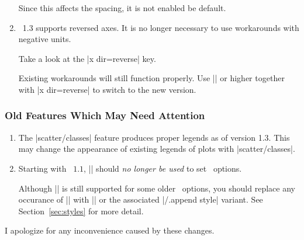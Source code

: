 \begin{enumerate}
	Since this affects the spacing, it is not enabled be default.

	\item \PGFPlots\ 1.3 supports reversed axes. It is no longer necessary to use workarounds with negative units.

	Take a look at the |x dir=reverse| key.

	Existing workarounds will still function properly. Use |\pgfplotsset{compat=1.3}| or higher together with |x dir=reverse| to switch to the new version.
\end{enumerate}

\subsubsection{Old Features Which May Need Attention}
\begin{enumerate}
	\item The |scatter/classes| feature produces proper legends as of version 1.3. This may change the appearance of existing legends of plots with |scatter/classes|.

	\item Starting with \PGFPlots\ $1.1$, |\tikzstyle| should \emph{no longer be used} to set \PGFPlots\ options.
	
	Although |\tikzstyle| is still supported for some older \PGFPlots\ options, you should replace any occurance of |\tikzstyle| with || or the associated |/.append style| variant. See Section~\ref{sec:styles} for more detail.
\end{enumerate}
I apologize for any inconvenience caused by these changes.

